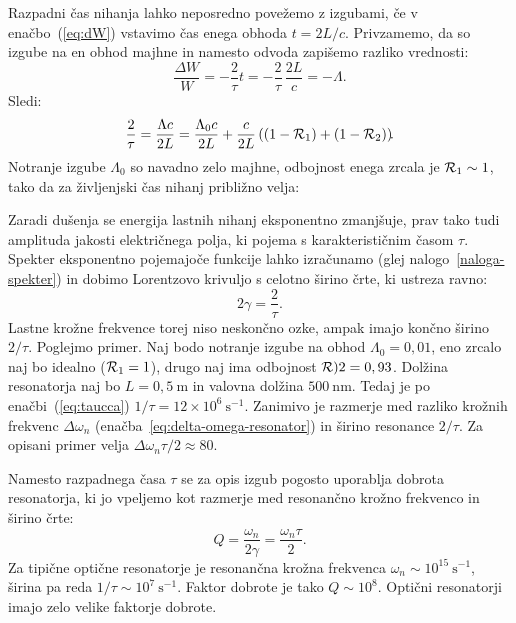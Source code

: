 Razpadni čas nihanja lahko neposredno povežemo z izgubami, če v enačbo~(\ref{eq:dW})
vstavimo čas enega obhoda $t=2L/c$. Privzamemo, da so izgube na en obhod majhne in namesto 
odvoda zapišemo razliko vrednosti:
\begin{equation}
\frac{\Delta W}{W}= -\frac{2}{\tau} t = -\frac{2}{\tau}\, \frac{2L}{c} = -\Lambda.
\end{equation}
Sledi:
\begin{equation}
\frac{2}{\tau}=\frac{\Lambda c}{2L}=\frac{\Lambda_0c}{2L}+\frac{c}{2L}\left((1-{\cal R}_{1})
+(1-{\cal R}_{2})\right)\!\!.
\label{taulambda}
\end{equation}
Notranje izgube $\Lambda_0$ so navadno zelo majhne, 
odbojnost enega zrcala je ${\cal R}_{1} \sim 1$, tako da za življenjski čas 
nihanj približno velja:

Zaradi dušenja se energija lastnih nihanj eksponentno zmanjšuje, prav tako tudi
amplituda jakosti električnega polja, ki pojema s karakterističnim časom $\tau$. 
Spekter eksponentno pojemajoče funkcije lahko izračunamo
(glej nalogo~\ref{naloga-spekter}) in dobimo Lorentzovo krivuljo 
s celotno širino črte, ki ustreza ravno:
\begin{equation}
2\gamma=\frac{2}{\tau}.
\label{3.26}
\end{equation}
Lastne krožne frekvence torej niso neskončno ozke, ampak imajo končno širino $2/\tau$.
Poglejmo primer. Naj bodo notranje izgube na obhod $\Lambda_0=0,01$,
eno zrcalo naj bo idealno (${\cal R}_1=1$), drugo naj ima odbojnost ${\cal R})2=0,93$. Dolžina
resonatorja naj bo $L=0,5~\si{\metre}$ in valovna dolžina $500~\si{\nano\metre}$. Tedaj
je po enačbi~(\ref{eq:taucca}) $1/\tau=12\times10^{6}~\si{\second}^{-1}$. Zanimivo je razmerje med 
razliko krožnih frekvenc $\Delta \omega_n$ 
(enačba~\ref{eq:delta-omega-resonator}) in širino resonance $2/\tau$. 
Za opisani primer velja $\Delta\omega_n\tau/2 \approx 80$.

\begin{remark}
Namesto razpadnega časa $\tau$ se za opis izgub pogosto uporablja
dobrota resonatorja, ki jo vpeljemo kot
razmerje med resonančno krožno frekvenco in širino črte:
\begin{equation}
Q=\frac{\omega_{n}}{2\gamma} = \frac{\omega_{n}\tau}{2}.
\end{equation}
Za tipične optične resonatorje je resonančna krožna
frekvenca $\omega_n \sim 10^{15}~\si{\second}^{-1}$, širina pa reda 
 $1/\tau \sim 10^{7}~\si{\second}^{-1}$. Faktor dobrote je tako $Q \sim 10^{8}$. Optični 
 resonatorji imajo zelo velike faktorje dobrote.
\end{remark}

